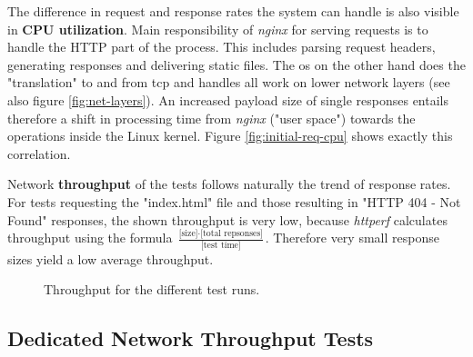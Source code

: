 The difference in request and response rates the system can handle is also visible in \textbf{CPU utilization}. Main responsibility of \textit{nginx} for serving requests is to handle the HTTP part of the process. This includes parsing request headers, generating responses and delivering static files. The \gls{os} on the other hand does the "translation" to and from \gls{tcp} and handles all work on lower network layers (see also figure \ref{fig:net-layers}). An increased payload size of single responses entails therefore a shift in processing time from \textit{nginx} ("user space") towards the operations inside the Linux kernel. Figure \ref{fig:initial-req-cpu} shows exactly this correlation.

\clearpage
Network \textbf{throughput} of the tests follows naturally the trend of response rates. For tests requesting the "index.html" file and those resulting in "HTTP 404 - Not Found" responses, the shown throughput is very low, because \textit{httperf} calculates throughput using the formula $\frac{\text{[size]} \cdot \text{[total repsonses]}}{\text{[test time]}}$. Therefore very small response sizes yield a low average throughput.

\begin{figure}[H]
	\centering
  \caption{Throughput for the different test runs.}
  \label{fig:initial-req-io}
\end{figure}

\subsection{Dedicated Network Throughput Tests}

